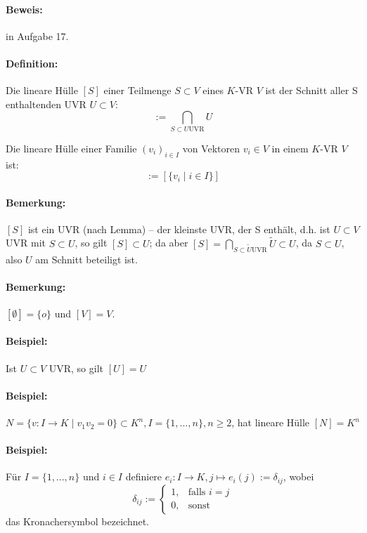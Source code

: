 \paragraph{Beweis:} in Aufgabe 17.
\paragraph{Definition:}
	Die lineare Hülle $[S]$ einer Teilmenge $S\subset V$ eines $ K $-VR $ V $ ist der Schnitt aller S enthaltenden UVR $U\subset V$:
    \begin{equation}
		[S] := \bigcap_{S\subset U \text{UVR}} U
	\end{equation}

    Die lineare Hülle einer Familie $(v_i)_{i\in I}$ von Vektoren $v_i\in V$ in einem $ K $-VR $ V $ ist:
        \begin{equation}
        [(v_i)_{i\in I}] := [\{v_i\mid i\in I\}]
        \end{equation}

\paragraph{Bemerkung:}
    $[S]$ ist ein UVR (nach Lemma) -- der \glqq kleinste\grqq{} UVR, der S enthält, d.h. ist $U\subset V$ UVR mit $S\subset U$, so gilt $[S]\subset U$; da aber $[S] = \bigcap_{S\subset \tilde{U}  \text{UVR}}\tilde{U}\subset U$,
    da $S\subset U$, also $U$ am Schnitt beteiligt ist.
    
\paragraph{Bemerkung:}
	$[\emptyset ] = \{o\}$ und $[V] = V$.
	
\paragraph{Beispiel:}
	Ist $U\subset V$ UVR, so gilt $[U] = U$
	
\paragraph{Beispiel:}
	$N=\{v:I\to K\mid v_1v_2=0\} \subset K^n,I=\{1,...,n\},n\geq 2$, hat lineare Hülle $[N]=K^n$
	
\paragraph{Beispiel:}
	Für $I=\{1,...,n\}$ und $i\in I$ definiere
	$e_i:I\to K , j\mapsto e_i(j):= \delta_{ij}$, wobei 
	\begin{equation*}
		\delta_{ij} :=
		\begin{cases}
			1,& \text{falls }i=j\\
			0,& \text{sonst}
		\end{cases}
	\end{equation*}
	das Kronachersymbol bezeichnet.
	
